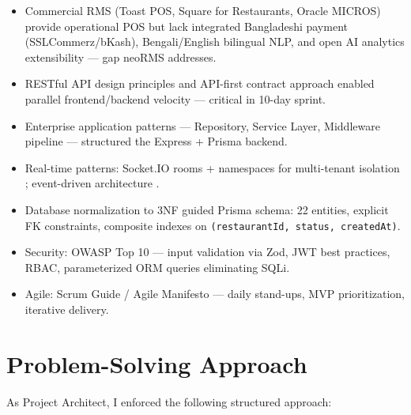 \begin{itemize}
\item Commercial RMS (Toast POS, Square for Restaurants, Oracle MICROS) provide operational POS but lack integrated Bangladeshi payment (SSLCommerz/bKash), Bengali/English bilingual NLP, and open AI analytics extensibility --- gap neoRMS addresses.
\item RESTful API design principles \cite{sommerville} and API-first contract approach enabled parallel frontend/backend velocity --- critical in 10-day sprint.
\item Enterprise application patterns \cite{fowler} --- Repository, Service Layer, Middleware pipeline --- structured the Express + Prisma backend.
\item Real-time patterns: Socket.IO rooms + namespaces for multi-tenant isolation \cite{socketio}; event-driven architecture \cite{newman}.
\item Database normalization to 3NF \cite{date} guided Prisma schema: 22 entities, explicit FK constraints, composite indexes on \texttt{(restaurantId, status, createdAt)}.
\item Security: OWASP Top 10 \cite{owasp} --- input validation via Zod, JWT best practices, RBAC, parameterized ORM queries eliminating SQLi.
\item Agile: Scrum Guide / Agile Manifesto \cite{agile} --- daily stand-ups, MVP prioritization, iterative delivery.
\end{itemize}

\section{Problem-Solving Approach}
\label{sec:approach}

As Project Architect, I enforced the following structured approach:

